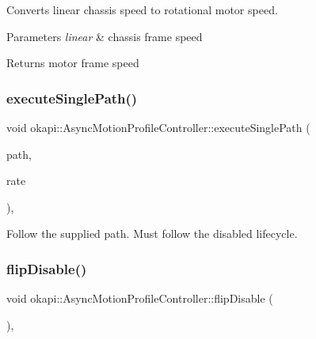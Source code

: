 Converts linear chassis speed to rotational motor speed.


\begin{DoxyParams}{Parameters}
{\em linear} & chassis frame speed \\
\hline
\end{DoxyParams}
\begin{DoxyReturn}{Returns}
motor frame speed 
\end{DoxyReturn}
\mbox{\label{classokapi_1_1AsyncMotionProfileController_abbc724e5856bff8879cb834bfc3cc6c3}} 
\subsubsection{\texorpdfstring{executeSinglePath()}{executeSinglePath()}}
{\footnotesize\ttfamily void okapi\+::\+Async\+Motion\+Profile\+Controller\+::execute\+Single\+Path (\begin{DoxyParamCaption}\item[{const \mbox{\hyperlink{structokapi_1_1AsyncMotionProfileController_1_1TrajectoryPair}{Trajectory\+Pair}} \&}]{path,  }\item[{std\+::unique\+\_\+ptr$<$ \mbox{\hyperlink{classokapi_1_1AbstractRate}{Abstract\+Rate}} $>$}]{rate }\end{DoxyParamCaption})\hspace{0.3cm}{\ttfamily [protected]}, {\ttfamily [virtual]}}

Follow the supplied path. Must follow the disabled lifecycle. \mbox{\label{classokapi_1_1AsyncMotionProfileController_a7069b2b7373aec21c84369392d8d34d8}} 
\subsubsection{\texorpdfstring{flipDisable()}{flipDisable()}\hspace{0.1cm}{\footnotesize\ttfamily [1/2]}}
{\footnotesize\ttfamily void okapi\+::\+Async\+Motion\+Profile\+Controller\+::flip\+Disable (\begin{DoxyParamCaption}{ }\end{DoxyParamCaption})\hspace{0.3cm}{\ttfamily [override]}, {\ttfamily [virtual]}}

